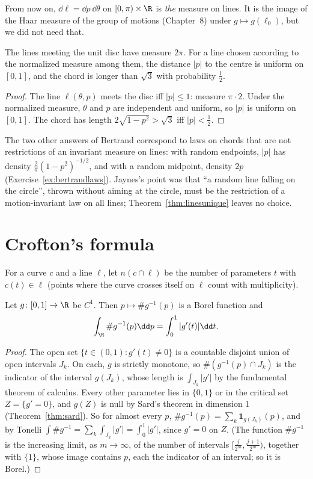 From now on, $\dd\ell=\dd p\,\dd\theta$ on $[0,\pi)\times\R$ is \emph{the} measure on lines. It is the image of the Haar measure of the group of motions (Chapter~8) under $g\mapsto g(\ell_0)$, but we
did not need that.

\begin{corollary}\label{cor:bertrand}
The lines meeting the unit disc have measure $2\pi$. For a line chosen according to the normalized measure among them, the distance $|p|$ to the centre is uniform on $[0,1]$, and the chord
is longer than $\sqrt3$ with probability $\frac12$.
\end{corollary}

\begin{proof}
The line $\ell(\theta,p)$ meets the disc iff $|p|\le1$: measure $\pi\cdot2$. Under the normalized measure, $\theta$ and $p$ are independent and uniform, so $|p|$ is uniform on $[0,1]$. The chord has length
$2\sqrt{1-p^2}>\sqrt3$ iff $|p|<\frac12$.
\end{proof}

The two other answers of Bertrand correspond to laws on chords that are not restrictions of an invariant measure on lines: with random endpoints, $|p|$ has density $\frac2\pi(1-p^2)^{-1/2}$,
and with a random midpoint, density $2p$ (Exercise~\ref{ex:bertrandlaws}). Jaynes's point was that ``a random line falling on the circle'', thrown without aiming at the circle, must be the
restriction of a motion-invariant law on all lines; Theorem~\ref{thm:linesunique} leaves no choice.

\section{Crofton's formula}

For a curve $c$ and a line $\ell$, let $n(c\cap\ell)$ be the number of parameters $t$ with $c(t)\in\ell$ (points where the curve crosses itself on $\ell$ count with multiplicity).

\begin{lemma}\label{lem:banach}
Let $g\colon[0,1]\to\R$ be $C^1$. Then $p\mapsto\#g^{-1}(p)$ is a Borel function and
\[\int_\R\#g^{-1}(p)\dd p=\int_0^1|g'(t)|\dd t.\]
\end{lemma}

\begin{proof}
The open set $\{t\in(0,1):g'(t)\neq0\}$ is a countable disjoint union of open intervals $J_k$. On each, $g$ is strictly monotone, so $\#(g^{-1}(p)\cap J_k)$ is the indicator of the interval $g(J_k)$, whose length is
$\int_{J_k}|g'|$ by the fundamental theorem of calculus. Every other parameter lies in $\{0,1\}$ or in the critical set $Z=\{g'=0\}$, and $g(Z)$ is null by Sard's theorem in dimension $1$
(Theorem~\ref{thm:sard}). So for almost every $p$, $\#g^{-1}(p)=\sum_k\mathbf 1_{g(J_k)}(p)$, and by Tonelli $\int\#g^{-1}=\sum_k\int_{J_k}|g'|=\int_0^1|g'|$, since $g'=0$ on $Z$. (The function $\#g^{-1}$ is the increasing
limit, as $m\to\infty$, of the number of intervals $[\frac j{2^m},\frac{j+1}{2^m})$, together with $\{1\}$, whose image contains $p$, each the indicator of an interval; so it is Borel.)
\end{proof}

